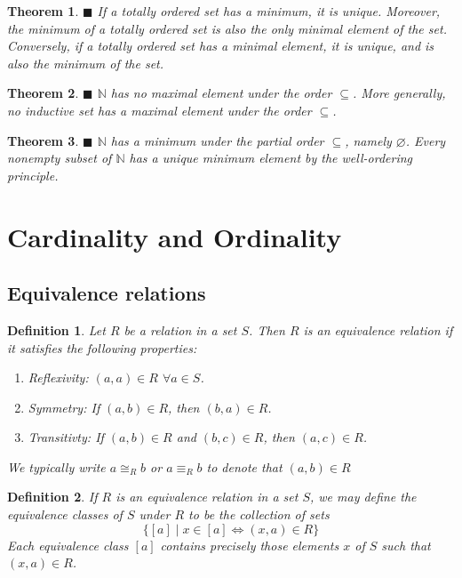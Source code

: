 \documentclass[a4paper]{article}
\newtheorem{mytheorem}{Theorem}
\newtheorem{mydef}{Definition}
\numberwithin{mytheorem}{section}
\numberwithin{mydef}{section}
\numberwithin{axiom}{section}
\numberwithin{example}{section}
\newcommand{\done}{$\blacksquare$ }
\begin{document}
\begin{mytheorem} \done If a totally ordered set has a minimum, it is unique. Moreover, the minimum of a totally ordered set is also the only minimal element of the set. Conversely, if a totally ordered set has a minimal element, it is unique, and is also the minimum of the set.
\end{mytheorem}

\begin{mytheorem} \done $\mathbb{N}$ has no maximal element under the order $\subseteq$. More generally, no inductive set has a maximal element under the order $\subseteq$.
\end{mytheorem}

\begin{mytheorem} \done $\mathbb{N}$ has a minimum under the partial order $\subseteq$, namely $\varnothing$. Every nonempty subset of $\mathbb{N}$ has a unique minimum element by the well-ordering principle.
\end{mytheorem}


\section{Cardinality and Ordinality}

\subsection{Equivalence relations}

\begin{mydef}Let $R$ be a relation in a set $S$. Then $R$ is an equivalence relation if it satisfies the following properties:
 \begin{enumerate}
 \item Reflexivity: $(a,a) \in R$ $\forall a \in S$. 
 \item Symmetry: If $(a,b) \in R$, then $(b,a) \in R$.
 \item Transitivty: If $(a,b) \in R$ and $(b,c) \in R$, then $(a,c) \in R$.
 \end{enumerate}
We typically write $a \cong_{R} b$ or $a \equiv_{R} b$ to denote that $(a,b) \in R$ 
\end{mydef}

\begin{mydef}If $R$ is an equivalence relation in a set $S$, we may define the equivalence classes of $S$ under $R$ to be the collection of sets $$ \bigl\{ [a] \mid x \in [a] \iff (x,a) \in R \bigr\} $$ Each equivalence class $[a]$ contains precisely those elements $x$ of $S$ such that $(x,a) \in R$.
\end{mydef}
\end{document}
